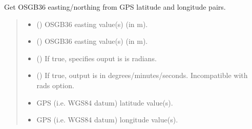 \documentclass[letterpaper,10pt,english]{sphinxmanual}
\begin{document}
\begin{fulllineitems}
\label{\detokenize{index:flood_tool.get_gps_lat_long_from_easting_northing}}
\pysigstartsignatures
{}
\pysigstopsignatures
\sphinxAtStartPar
Get OSGB36 easting/northing from GPS latitude and
longitude pairs.
\begin{quote}\begin{description}
\begin{itemize}
\item {} 
\sphinxAtStartPar
{} () \textendash{} OSGB36 easting value(s) (in m).

\item {} 
\sphinxAtStartPar
{} () \textendash{} OSGB36 easting value(s) (in m).

\item {} 
\sphinxAtStartPar
{} (\sphinxstyleliteralemphasis{\sphinxupquote{ (}}\sphinxstyleliteralemphasis{\sphinxupquote{)}}) \textendash{} If true, specifies ouput is is radians.

\item {} 
\sphinxAtStartPar
{} (\sphinxstyleliteralemphasis{\sphinxupquote{ (}}\sphinxstyleliteralemphasis{\sphinxupquote{)}}) \textendash{} If true, output is in degrees/minutes/seconds. Incompatible
with rads option.

\end{itemize}

\sphinxAtStartPar
\begin{itemize}
\item {} 
\sphinxAtStartPar
{} \textendash{} GPS (i.e. WGS84 datum) latitude value(s).

\item {} 
\sphinxAtStartPar
{} \textendash{} GPS (i.e. WGS84 datum) longitude value(s).


\end{itemize}
\end{description}
\end{quote}
\end{fulllineitems}
\end{document}

